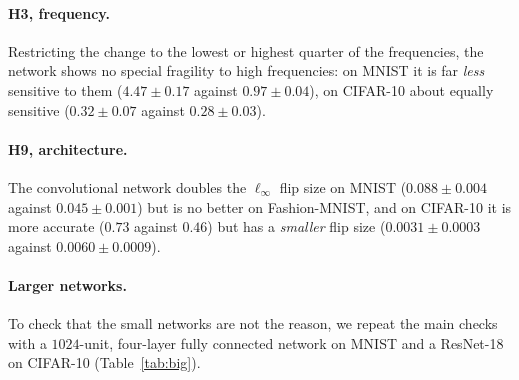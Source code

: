 \documentclass[11pt]{article}
\begin{document}
\paragraph{H3, frequency.} Restricting the change to the lowest or highest quarter of the frequencies, the network shows no special fragility to high frequencies: on MNIST it is far \emph{less} sensitive to them ($4.47\pm0.17$ against $0.97\pm0.04$), on CIFAR-10 about equally sensitive ($0.32\pm0.07$ against $0.28\pm0.03$).

\paragraph{H9, architecture.} The convolutional network doubles the $\ell_\infty$ flip size on MNIST ($0.088\pm0.004$ against $0.045\pm0.001$) but is no better on Fashion-MNIST, and on CIFAR-10 it is more accurate ($0.73$ against $0.46$) but has a \emph{smaller} flip size ($0.0031\pm0.0003$ against $0.0060\pm0.0009$).

\paragraph{Larger networks.} To check that the small networks are not the reason, we repeat the main checks with a $1024$-unit, four-layer fully connected network on MNIST and a ResNet-18 on CIFAR-10 (Table~\ref{tab:big}).

\begin{table}[H]
\centering
\caption{Larger networks. Median flip sizes ($\ell_\infty$ unless marked $\ell_2$); same conditions as the small networks.}
\label{tab:big}
\small
{}
\end{table}
\end{document}
